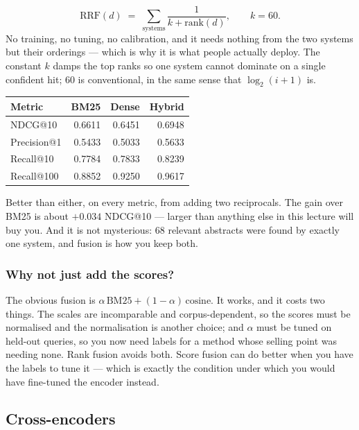 \documentclass[11pt,a4paper]{article}
\begin{document}
\begin{derivbox}[title={Reciprocal rank fusion}]
\[
  \text{RRF}(d) \;=\; \sum_{\text{systems}} \frac{1}{k + \text{rank}(d)},
  \qquad k = 60 .
\]
No training, no tuning, no calibration, and it needs nothing from the two
systems but their orderings --- which is why it is what people actually deploy.
The constant $k$ damps the top ranks so one system cannot dominate on a single
confident hit; 60 is conventional, in the same sense that $\log_2(i+1)$ is.
\end{derivbox}

\begin{center}
\small
\begin{tabular}{lrrr}
\toprule
\textbf{Metric} & \textbf{BM25} & \textbf{Dense} & \textbf{Hybrid} \\
\midrule
NDCG@10     & 0.6611 & 0.6451 & 0.6948 \\
Precision@1 & 0.5433 & 0.5033 & 0.5633 \\
Recall@10   & 0.7784 & 0.7833 & 0.8239 \\
Recall@100  & 0.8852 & 0.9250 & 0.9617 \\
\bottomrule
\end{tabular}
\end{center}

Better than either, on every metric, from adding two reciprocals. The gain over
BM25 is about $+0.034$ NDCG@10 --- larger than anything else in this lecture
will buy you. And it is not mysterious: 68 relevant abstracts were found by
exactly one system, and fusion is how you keep both.

\subsubsection{Why not just add the scores?}

The obvious fusion is $\alpha\,\text{BM25} + (1-\alpha)\,\text{cosine}$. It
works, and it costs two things. The scales are incomparable and
corpus-dependent, so the scores must be normalised and the normalisation is
another choice; and $\alpha$ must be tuned on held-out queries, so you now need
labels for a method whose selling point was needing none. Rank fusion avoids
both. Score fusion can do better when you have the labels to tune it --- which
is exactly the condition under which you would have fine-tuned the encoder
instead.

\subsection{Cross-encoders}
\end{document}

